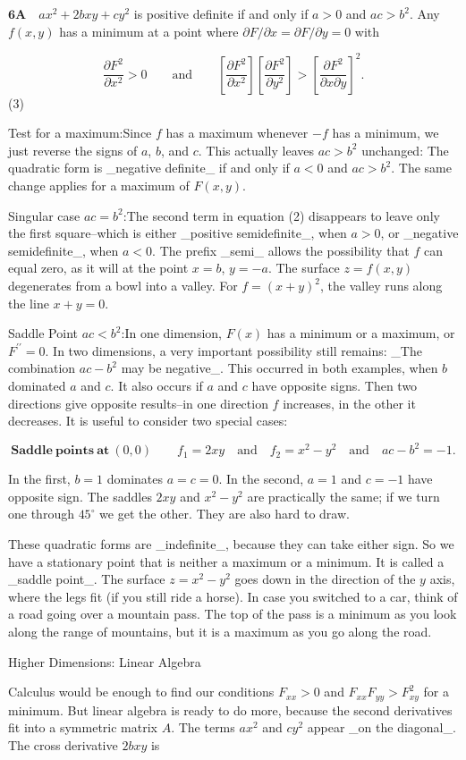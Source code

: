 \(\mathbf{6A}\quad ax^{2}+2bxy+cy^{2}\) is positive definite if and only if \(a>0\) and \(ac>b^{2}\). Any \(f(x,y)\) has a minimum at a point where \(\partial F/\partial x=\partial F/\partial y=0\) with

\[\frac{\partial F^{2}}{\partial x^{2}}>0\qquad\text{and}\qquad\left[\frac{ \partial F^{2}}{\partial x^{2}}\right]\left[\frac{\partial F^{2}}{\partial y^ {2}}\right]>\left[\frac{\partial F^{2}}{\partial x\partial y}\right]^{2}.\] (3)

Test for a maximum:Since \(f\) has a maximum whenever \(-f\) has a minimum, we just reverse the signs of \(a\), \(b\), and \(c\). This actually leaves \(ac>b^{2}\) unchanged: The quadratic form is _negative definite_ if and only if \(a<0\) and \(ac>b^{2}\). The same change applies for a maximum of \(F(x,y)\).

Singular case \(ac=b^{2}\):The second term in equation (2) disappears to leave only the first square--which is either _positive semidefinite_, when \(a>0\), or _negative semidefinite_, when \(a<0\). The prefix _semi_ allows the possibility that \(f\) can equal zero, as it will at the point \(x=b\), \(y=-a\). The surface \(z=f(x,y)\) degenerates from a bowl into a valley. For \(f=(x+y)^{2}\), the valley runs along the line \(x+y=0\).

Saddle Point \(ac<b^{2}\):In one dimension, \(F(x)\) has a minimum or a maximum, or \(F^{\prime\prime}=0\). In two dimensions, a very important possibility still remains: _The combination \(ac-b^{2}\) may be negative_. This occurred in both examples, when \(b\) dominated \(a\) and \(c\). It also occurs if \(a\) and \(c\) have opposite signs. Then two directions give opposite results--in one direction \(f\) increases, in the other it decreases. It is useful to consider two special cases:

\[\mathbf{Saddle\ points\ at}\ (0,0)\qquad f_{1}=2xy\quad\text{and}\quad f_{2}=x^{2 }-y^{2}\quad\text{and}\quad ac-b^{2}=-1.\]

In the first, \(b=1\) dominates \(a=c=0\). In the second, \(a=1\) and \(c=-1\) have opposite sign. The saddles \(2xy\) and \(x^{2}-y^{2}\) are practically the same; if we turn one through \(45^{\circ}\) we get the other. They are also hard to draw.

These quadratic forms are _indefinite_, because they can take either sign. So we have a stationary point that is neither a maximum or a minimum. It is called a _saddle point_. The surface \(z=x^{2}-y^{2}\) goes down in the direction of the \(y\) axis, where the legs fit (if you still ride a horse). In case you switched to a car, think of a road going over a mountain pass. The top of the pass is a minimum as you look along the range of mountains, but it is a maximum as you go along the road.

Higher Dimensions: Linear Algebra

Calculus would be enough to find our conditions \(F_{xx}>0\) and \(F_{xx}F_{yy}>F_{xy}^{2}\) for a minimum. But linear algebra is ready to do more, because the second derivatives fit into a symmetric matrix \(A\). The terms \(ax^{2}\) and \(cy^{2}\) appear _on the diagonal_. The cross derivative \(2bxy\) is 